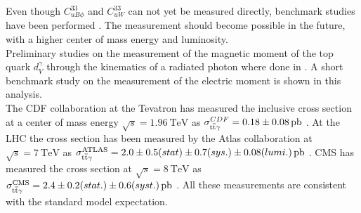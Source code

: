 Even though $C_{uB\phi}^{33}$ and $C_{uW}^{33}$ can not yet be measured directly, benchmark studies have been performed \cite{Hermanns:1292768}. The measurement should become possible in the future, with a higher center of mass energy and luminosity. \\
Preliminary studies on the measurement of the magnetic moment of the top quark $d_V^{\gamma}$ through the kinematics of a radiated photon where done in . A short benchmark study on the measurement of the electric moment is shown in this analysis. \\
The CDF collaboration at the Tevatron has measured the inclusive \ttgamma cross section at a center of mass energy $\sqrt{s} = \SI{1.96}{\tera \electronvolt}$  as $\sigma_{\ttgamma}^{CDF} = \SI{0.18\pm0.08}{\pico \barn}$ \cite{Aaltonen:2011sp}. At the LHC the \ttgamma cross section has been measured by the Atlas collaboration at $\sqrt{s} = \SI{7}{\tera \electronvolt}$ as $\sigma_{\ttgamma}^{\mathrm{ATLAS}} = \SI[parse-numbers=false]{2.0 \pm 0.5 (stat) \pm 0.7 (sys.) \pm 0.08 (lumi.)}{\pico \barn}$ \cite{ATLAS-CONF-2011-122}. CMS has measured the \ttgamma cross section at $\sqrt{s} = \SI{8}{\tera \electronvolt}$ as $\sigma_{\ttgamma}^{\mathrm{CMS}} = \SI[parse-numbers=false]{2.4 \pm 0.2(stat.) \pm 0.6(syst.)}{\pico \barn}$ \cite{CMS-PAS-TOP-13-011}. All these measurements are consistent with the standard model expectation. 